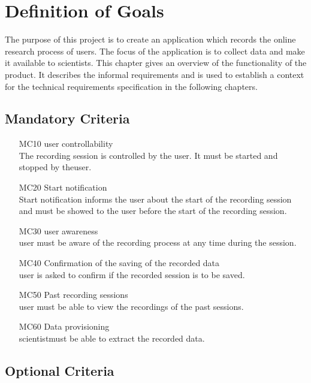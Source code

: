 \chapter{Definition of Goals}
\label{ch:goals}

The purpose of this project is to create an application which records the online research process of \glspl{user}. The focus of the application is to collect data and make it available to \glspl{scientist}. This chapter gives an overview of the functionality of the product. It describes the informal requirements and is used to establish a context for the technical requirements specification in the following chapters.

\section{Mandatory Criteria}

\begin{itemize}

	\item[MC10]\Gls{user} controllability\\The recording \gls{session} is controlled by the \gls{user}. It must be started and stopped by the\gls{user}.
	\item[MC20]Start notification\\Start notification informs the \Gls{user} about the start of the recording \gls{session} and must be showed to the user before the start of the recording \gls{session}. 
	\item[MC30]\Gls{user} awareness\\\Gls{user} must be aware of the recording process at any time during the \gls{session}.
	\item[MC40]Confirmation of the saving of the recorded data\\\Gls{user} is asked to confirm if the recorded \gls{session} is to be saved.
	\item[MC50]Past recording \glspl{session}\\\Gls{user} must be able to view the recordings of the past \glspl{session}.
	\item[MC60]Data provisioning\\\Gls{scientist}must be able to extract the recorded data.
	
\end{itemize}

\section{Optional Criteria}

